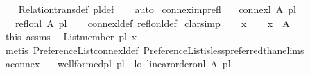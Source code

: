 \begin{isabellebody}
%
\isadelimproof
\ \ %
\endisadelimproof
%
\isatagproof
{}\isamarkupfalse%
\ Relation{\isachardot}{\kern0pt}trans{\isacharunderscore}{\kern0pt}def\ pl{\isacharunderscore}{\kern0pt}{\isasymalpha}{\isacharunderscore}{\kern0pt}def\isanewline
\ \ \isamarkupfalse%
\ auto%
\endisatagproof
{\isafoldproof}%
%
\isadelimproof
\isanewline
%
\endisadelimproof
\isanewline
{}\isamarkupfalse%
\ connex{\isacharunderscore}{\kern0pt}imp{\isacharunderscore}{\kern0pt}refl{\isacharcolon}{\kern0pt}\isanewline
\ \ \ {\isachardoublequoteopen}connex{\isacharunderscore}{\kern0pt}l\ A\ pl{\isachardoublequoteclose}\isanewline
\ \ \ {\isachardoublequoteopen}refl{\isacharunderscore}{\kern0pt}on{\isacharunderscore}{\kern0pt}l\ A\ pl{\isachardoublequoteclose}\isanewline
%
\isadelimproof
\ \ %
\endisadelimproof
%
\isatagproof
{}\isamarkupfalse%
\ connex{\isacharunderscore}{\kern0pt}l{\isacharunderscore}{\kern0pt}def\ refl{\isacharunderscore}{\kern0pt}on{\isacharunderscore}{\kern0pt}l{\isacharunderscore}{\kern0pt}def\isanewline
{}\isamarkupfalse%
\ clarsimp\isanewline
\ \ \isamarkupfalse%
\ x\isanewline
\ \ \isamarkupfalse%
\ {\isachardoublequoteopen}x\ {\isasymin}\ A{\isachardoublequoteclose}\isanewline
\ \ \isamarkupfalse%
\ this\ assms\ \isamarkupfalse%
\ {\isachardoublequoteopen}List{\isachardot}{\kern0pt}member\ pl\ x{\isachardoublequoteclose}\isanewline
\ \ \ \ \isamarkupfalse%
\ {\isacharparenleft}{\kern0pt}metis\ Preference{\isacharunderscore}{\kern0pt}List{\isachardot}{\kern0pt}connex{\isacharunderscore}{\kern0pt}l{\isacharunderscore}{\kern0pt}def\ Preference{\isacharunderscore}{\kern0pt}List{\isachardot}{\kern0pt}is{\isacharunderscore}{\kern0pt}less{\isacharunderscore}{\kern0pt}preferred{\isacharunderscore}{\kern0pt}than{\isachardot}{\kern0pt}elims{\isacharparenleft}{\kern0pt}{}{\isacharparenright}{\kern0pt}{\isacharparenright}{\kern0pt}\isanewline
{}\isamarkupfalse%
%
\endisatagproof
{\isafoldproof}%
%
\isadelimproof
\ \ \isanewline
%
\endisadelimproof
\isanewline
{}\isamarkupfalse%
\ aconnex{\isacharcolon}{\kern0pt}\isanewline
\ \ \ {\isachardoublequoteopen}well{\isacharunderscore}{\kern0pt}formed{\isacharunderscore}{\kern0pt}pl\ pl{\isachardoublequoteclose}\ \ lo{\isacharcolon}{\kern0pt}\ {\isachardoublequoteopen}linear{\isacharunderscore}{\kern0pt}order{\isacharunderscore}{\kern0pt}on{\isacharunderscore}{\kern0pt}l\ A\ pl{\isachardoublequoteclose}\isanewline

\end{isabellebody}
